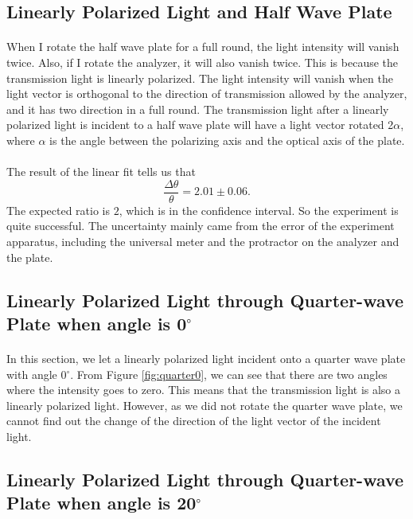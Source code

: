\documentclass{my_template}
\begin{document}
    \subsection{Linearly Polarized Light and Half Wave Plate}
    \paragraph{} When I rotate the half wave plate for a full round, the light intensity will vanish twice. Also, if I rotate the analyzer, it will also vanish twice. This is because the transmission light is linearly polarized. The light intensity will vanish when the light vector is orthogonal to the direction of transmission allowed by the analyzer, and it has two direction in a full round. The transmission light after a linearly polarized light is incident to a half wave plate will have a light vector rotated 2$\alpha$, where $\alpha$ is the angle between the polarizing axis and the optical axis of the plate.
    \vspace{-5mm}
    \paragraph{}The result of the linear fit tells us that $$\frac{\Delta\theta}{\theta}=2.01\pm 0.06.$$ The expected ratio is $2$, which is in the confidence interval. So the experiment is quite successful. The uncertainty mainly came from the error of the experiment apparatus, including the universal meter and the protractor on the analyzer and the plate.
    \subsection{Linearly Polarized Light through Quarter-wave Plate when angle is 0$^\circ$ }
    \paragraph{} In this section, we let a linearly polarized light incident onto a quarter wave plate with angle 0$^\circ$. From Figure \ref{fig:quarter0}, we can see that there are two angles where the intensity goes to zero. This means that the transmission light is also a linearly polarized light. However, as we did not rotate the quarter wave plate, we cannot find out the change of the direction of the light vector of the incident light. 
    \subsection{Linearly Polarized Light through Quarter-wave Plate when angle is 20$^\circ$}
\end{document}
